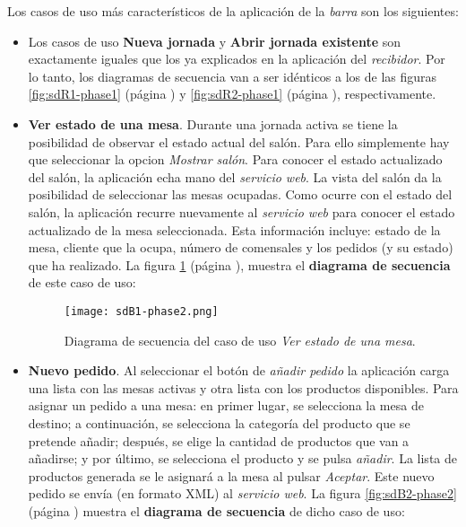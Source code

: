 Los casos de uso más característicos de la aplicación de la \emph{barra} son
los siguientes:
\begin{itemize}
\item Los casos de uso \textbf{Nueva jornada} y \textbf{Abrir jornada
existente} son exactamente iguales que los ya explicados en la aplicación
del \emph{recibidor}. Por lo tanto, los diagramas de secuencia van a ser 
idénticos a los de las figuras \ref{fig:sdR1-phase1} (página
\pageref{fig:sdR1-phase1}) y \ref{fig:sdR2-phase1} (página
\pageref{fig:sdR2-phase1}), respectivamente.
\item \textbf{Ver estado de una mesa}. Durante una jornada activa se tiene
la posibilidad de observar el estado actual del salón. Para ello simplemente
hay que seleccionar la opcion \emph{Mostrar salón}. Para conocer el estado
actualizado del salón, la aplicación echa mano del \emph{servicio web}.
La vista del salón da la posibilidad de seleccionar las mesas ocupadas. Como
ocurre con el estado del salón, la aplicación recurre nuevamente al
\emph{servicio web} para conocer el estado actualizado de la mesa seleccionada.
Esta información incluye: estado de la mesa, cliente que la ocupa, número
de comensales y los pedidos (y su estado) que ha realizado. La figura
\ref{fig:sdB1-phase2} (página \pageref{fig:sdB1-phase2}), muestra el
\textbf{diagrama de secuencia} de este caso de uso:

  \begin{figure}[!h]
    \begin{center}
      \texttt{[image: sdB1-phase2.png]}
      \caption{Diagrama de secuencia del caso de uso \emph{Ver estado de
      una mesa}.}
      \label{fig:sdB1-phase2}
    \end{center}
  \end{figure}

\item \textbf{Nuevo pedido}. Al seleccionar el botón de \emph{añadir pedido}
la aplicación carga una lista con las mesas activas y otra lista con los
productos disponibles. Para asignar un pedido a una mesa: en primer lugar, se
selecciona la mesa de destino; a continuación, se selecciona la categoría
del producto que se pretende añadir; después, se elige la cantidad de
productos que van a añadirse; y por último, se selecciona el producto y se
pulsa \emph{añadir}. La lista de productos generada se le asignará a la mesa
al pulsar \emph{Aceptar}. Este nuevo pedido se envía (en formato \acs{XML})
al \emph{servicio web}. La figura \ref{fig:sdB2-phase2} (página
\pageref{fig:sdB2-phase2}) muestra el \textbf{diagrama de secuencia} de dicho
caso de uso:


\end{itemize}

